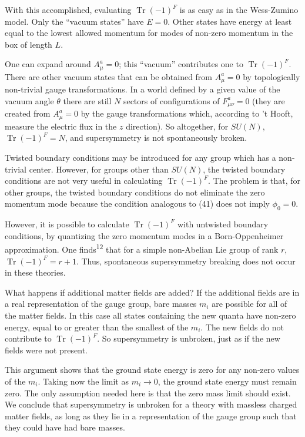 
With this accomplished, evaluating $\operatorname{Tr}(-1)^F$ is as easy as in the
Wess-Zumino model. Only the ``vacuum states'' have $E = 0$. Other
states have energy at least equal to the lowest allowed momentum for
modes of non-zero momentum in the box of length $L$.

One can expand around $A_\mu^a = 0$; this ``vacuum'' contributes one to
$\operatorname{Tr}(-1)^F$. There are other vacuum states that can be obtained from
$A_\mu^a = 0$ by topologically non-trivial gauge transformations. In a
world defined by a given value of the vacuum angle $\theta$ there are still
$N$ sectors of configurations of $F_{\mu\nu}^a = 0$ (they are created from $A_\mu^a = 0$
by the gauge transformations which, according to 't Hooft, measure
the electric flux in the $z$ direction). So altogether, for $SU(N)$,
$\operatorname{Tr}(-1)^F = N$, and supersymmetry is not spontaneously broken.

Twisted boundary conditions may be introduced for any group
which has a non-trivial center. However, for groups other than $SU(N)$,
the twisted boundary conditions are not very useful in calculating
$\operatorname{Tr}(-1)^F$. The problem is that, for other groups, the twisted boundary
conditions do not eliminate the zero momentum mode because the
condition analogous to (41) does not imply $\phi_0 = 0$.

However, it is possible to calculate $\operatorname{Tr}(-1)^F$ with untwisted
boundary conditions, by quantizing the zero momentum modes in a
Born-Oppenheimer approximation. One finds\textsuperscript{12} that for a simple non-Abelian
Lie group of rank $r$, $\operatorname{Tr}(-1)^F = r + 1$. Thus, spontaneous supersymmetry
breaking does not occur in these theories.

What happens if additional matter fields are added? If the additional
fields are in a real representation of the gauge group, bare
masses $m_i$ are possible for all of the matter fields. In this case
all states containing the new quanta have non-zero energy, equal to
or greater than the smallest of the $m_i$. The new fields do not contribute
to $\operatorname{Tr}(-1)^F$. So supersymmetry is unbroken, just as if the
new fields were not present.

This argument shows that the ground state energy is zero for any
non-zero values of the $m_i$. Taking now the limit as $m_i \to 0$, the ground
state energy must remain zero. The only assumption needed here is that
the zero mass limit should exist. We conclude that supersymmetry is
unbroken for a theory with massless charged matter fields, as long as
they lie in a representation of the gauge group such that they could
have had bare masses.

